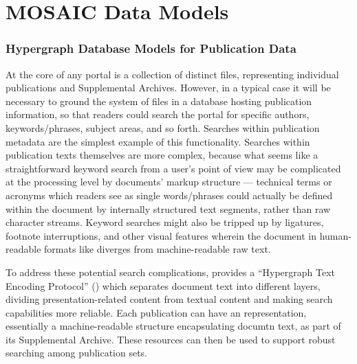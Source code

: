 \documentclass[11pt,letterpaper]{article}
\let\OldPart\part
\renewcommand{\part}[1]{\OldPart{#1}%
\vspace{-.5em}}
\newcommand{\HTXN}{\resizebox{!}{7pt}{\ATexttclr{HTXN}}}
\newcommand{\ATexttclr}[1]{\textcolor{tcolor}{\textbf{#1}}}
\newcommand{\lMOSAIC}{%
\resizebox{!}{8pt}{\ATexttclr{M}}%
\resizebox{!}{6pt}{\ATexttclr{OSAIC}}}
\newcommand{\textscc}[1]{{\color{orr!35!black}{{%
						\fontfamily{Cabin-TLF}\fontseries{b}\selectfont{\textsc{\scriptsize{#1}}}}}}}
\newcommand{\AcronymText}[1]{{\textscc{#1}}}
\newcommand{\MOSAIC}{\resizebox{!}{7pt}{\ATexttclr{MOSAIC}}}
\newcommand{\PDF}{\resizebox{!}{7pt}{\AcronymText{PDF}}}
\newcommand{\p}[1]{

\vspace{.75em}#1}
\newcommand{\q}[1]{{\fontfamily{qcr}\selectfont ``}#1{\fontfamily{qcr}\selectfont ''}}
\begin{document}
{%

\part{MOSAIC Data Models}
\section{Hypergraph Database Models for Publication Data}
\p{At the core of any \MOSAIC{} portal is a collection of 
distinct files, representing individual publications and 
Supplemental Archives.  However, in a typical case it 
will be necessary to ground the system of files in a 
database hosting publication information, so that 
readers could search the portal for specific authors, 
keywords/phrases, subject areas, and so forth.  
Searches within publication metadata are the simplest 
example of this functionality.  Searches within publication 
texts themselves are more complex, because what seems like a 
straightforward keyword search from a user's point of 
view may be complicated at the processing level by 
documents' markup structure --- technical terms or acronyms 
which readers see as single words/phrases could actually be 
defined within the document by internally structured text 
segments, rather than raw character streams.  Keyword searches 
might also be tripped up by ligatures, footnote interruptions, and 
other visual features wherein the document in human-readable 
formats like \PDF{} diverges from machine-readable raw text.}

\p{To address these potential search complications, \MOSAIC{} 
provides a \q{Hypergraph Text Encoding Protocol} (\HTXN{}) 
which separates document text into different layers, dividing 
presentation-related content from textual content and making 
search capabilities more reliable.  Each publication can have an 
\HTXN{} representation, essentially a machine-readable structure 
encapsulating documtn text, as part of its Supplemental Archive.  
These \HTXN{} resources can then be used to support 
robust searching among publication sets.}

}
\end{document}
